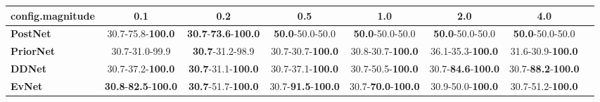 \begin{tabular}{lccccccc}
\toprule
\textbf{config.magnitude} &                                         0.1 &                                         0.2 &                                0.5 &                                1.0 &                                2.0 &                                4.0 \\
\midrule
\textbf{PostNet } &                    30.7-75.8-\textbf{100.0} &  \textbf{30.7}-\textbf{73.6}-\textbf{100.0} &            \textbf{50.0}-50.0-50.0 &            \textbf{50.0}-50.0-50.0 &            \textbf{50.0}-50.0-50.0 &            \textbf{50.0}-50.0-50.0 \\
\textbf{PriorNet} &                              30.7-31.0-99.9 &                     \textbf{30.7}-31.2-98.9 &           30.7-30.7-\textbf{100.0} &           30.8-30.7-\textbf{100.0} &           36.1-35.3-\textbf{100.0} &           31.6-30.9-\textbf{100.0} \\
\textbf{DDNet   } &                    30.7-37.2-\textbf{100.0} &           \textbf{30.7}-31.1-\textbf{100.0} &           30.7-37.1-\textbf{100.0} &           30.7-50.5-\textbf{100.0} &  30.7-\textbf{84.6}-\textbf{100.0} &  30.7-\textbf{88.2}-\textbf{100.0} \\
\textbf{EvNet   } &  \textbf{30.8}-\textbf{82.5}-\textbf{100.0} &           \textbf{30.7}-51.7-\textbf{100.0} &  30.7-\textbf{91.5}-\textbf{100.0} &  30.7-\textbf{70.0}-\textbf{100.0} &           30.9-50.0-\textbf{100.0} &           30.7-51.2-\textbf{100.0} \\
\bottomrule
\end{tabular}
